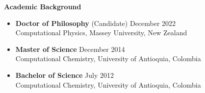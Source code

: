 {\bf\Large Academic \textcolor{my_blue}{Background}}\\ \vspace*{-6mm}

\begin{itemize}
    \itemsep-1mm
    \item {\bf Doctor of Philosophy} (Candidate)\hfill
          \textcolor{my_blue}{December 2022}\\
          Computational Physics, Massey University, New Zealand
    \item {\bf Master of Science}\hfill
          \textcolor{my_blue}{December 2014}\\
          Computational Chemistry, University of Antioquia, Colombia
    \item {\bf Bachelor of Science}\hfill
          \textcolor{my_blue}{July 2012}\\
          Computational Chemistry, University of Antioquia, Colombia
\end{itemize}